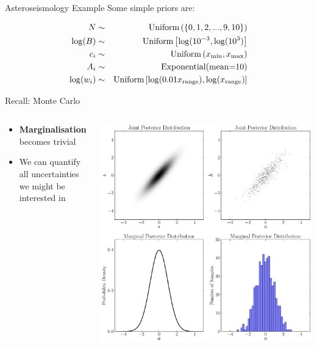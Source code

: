 \begin{frame}[t]{Asteroseismology Example}
Some simple priors are:

\begin{eqnarray*}
N &\sim& \textnormal{Uniform}\left(\{0, 1, 2, ..., 9, 10\}\right)\\
\log(B) &\sim& \textnormal{Uniform}\left[\log(10^{-3}, \log(10^{3})\right]\\
c_i &\sim& \textnormal{Uniform}\left(x_{\rm min}, x_{\rm max}\right)\\
A_i &\sim& \textnormal{Exponential}(\textnormal{mean=10})\\
\log(w_i) &\sim& \textnormal{Uniform}\left[\log(0.01 x_{\rm range}), \log(x_{\rm range})\right]
\end{eqnarray*}

\end{frame}



\begin{frame}[t]{Recall: Monte Carlo}
\begin{columns}[T]
\begin{column}{0.35\textwidth}
  \vspace{20pt}
  \begin{itemize}
  \setlength{\itemsep}{10pt}
  \item {\bf Marginalisation} becomes trivial
  \item We can quantify all uncertainties we might be interested in
  \end{itemize}
\end{column}
\hfill
\begin{column}{0.5\textwidth}
  \hspace{-30pt}
  \includegraphics[scale=0.22]{marginalisation.pdf}
\end{column}

\end{columns}
\end{frame}


